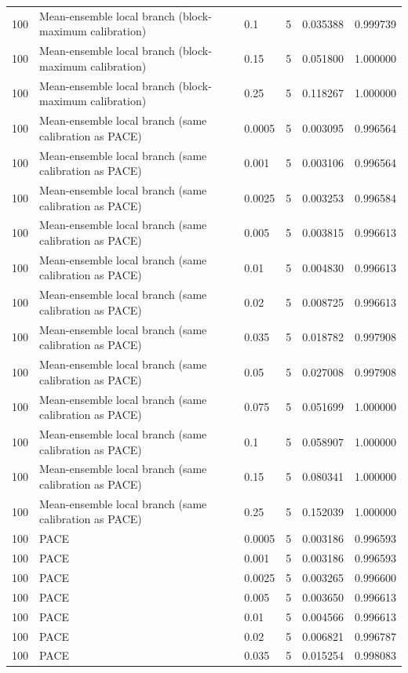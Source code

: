 \begin{tabular}{llllll}
100 & Mean-ensemble local branch (block-maximum calibration) & 0.1 & 5 & 0.035388 & 0.999739 \\
100 & Mean-ensemble local branch (block-maximum calibration) & 0.15 & 5 & 0.051800 & 1.000000 \\
100 & Mean-ensemble local branch (block-maximum calibration) & 0.25 & 5 & 0.118267 & 1.000000 \\
100 & Mean-ensemble local branch (same calibration as PACE) & 0.0005 & 5 & 0.003095 & 0.996564 \\
100 & Mean-ensemble local branch (same calibration as PACE) & 0.001 & 5 & 0.003106 & 0.996564 \\
100 & Mean-ensemble local branch (same calibration as PACE) & 0.0025 & 5 & 0.003253 & 0.996584 \\
100 & Mean-ensemble local branch (same calibration as PACE) & 0.005 & 5 & 0.003815 & 0.996613 \\
100 & Mean-ensemble local branch (same calibration as PACE) & 0.01 & 5 & 0.004830 & 0.996613 \\
100 & Mean-ensemble local branch (same calibration as PACE) & 0.02 & 5 & 0.008725 & 0.996613 \\
100 & Mean-ensemble local branch (same calibration as PACE) & 0.035 & 5 & 0.018782 & 0.997908 \\
100 & Mean-ensemble local branch (same calibration as PACE) & 0.05 & 5 & 0.027008 & 0.997908 \\
100 & Mean-ensemble local branch (same calibration as PACE) & 0.075 & 5 & 0.051699 & 1.000000 \\
100 & Mean-ensemble local branch (same calibration as PACE) & 0.1 & 5 & 0.058907 & 1.000000 \\
100 & Mean-ensemble local branch (same calibration as PACE) & 0.15 & 5 & 0.080341 & 1.000000 \\
100 & Mean-ensemble local branch (same calibration as PACE) & 0.25 & 5 & 0.152039 & 1.000000 \\
100 & PACE & 0.0005 & 5 & 0.003186 & 0.996593 \\
100 & PACE & 0.001 & 5 & 0.003186 & 0.996593 \\
100 & PACE & 0.0025 & 5 & 0.003265 & 0.996600 \\
100 & PACE & 0.005 & 5 & 0.003650 & 0.996613 \\
100 & PACE & 0.01 & 5 & 0.004566 & 0.996613 \\
100 & PACE & 0.02 & 5 & 0.006821 & 0.996787 \\
100 & PACE & 0.035 & 5 & 0.015254 & 0.998083 \\

\end{tabular}
